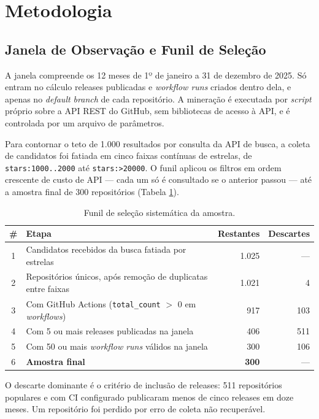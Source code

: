 \documentclass[12pt]{article}
\begin{document}
\section{Metodologia}
\label{sec:metodologia}

\subsection{Janela de Observação e Funil de Seleção}

A janela compreende os 12 meses de 1º de janeiro a 31 de dezembro de 2025. Só entram no
cálculo releases publicadas e \emph{workflow runs} criados dentro dela, e apenas no
\emph{default branch} de cada repositório. A mineração é executada por \emph{script}
próprio sobre a API REST do GitHub, sem bibliotecas de acesso à API, e é controlada por um
arquivo de parâmetros.

Para contornar o teto de 1.000 resultados por consulta da API de busca, a coleta de
candidatos foi fatiada em cinco faixas contínuas de estrelas, de \texttt{stars:1000..2000}
até \texttt{stars:>20000}. O funil aplicou os filtros em ordem crescente de custo de API ---
cada um só é consultado se o anterior passou --- até a amostra final de 300 repositórios
(Tabela \ref{tab:funil}).

\begin{table}[ht]
\centering
\caption{Funil de seleção sistemática da amostra.}
\label{tab:funil}
\footnotesize
\begin{tabular}{clrr}
\toprule
\textbf{\#} & \textbf{Etapa} & \textbf{Restantes} & \textbf{Descartes} \\
\midrule
1 & Candidatos recebidos da busca fatiada por estrelas & 1.025 & --- \\
2 & Repositórios únicos, após remoção de duplicatas entre faixas & 1.021 & 4 \\
3 & Com GitHub Actions (\texttt{total\_count} $>$ 0 em \emph{workflows}) & 917 & 103 \\
4 & Com 5 ou mais releases publicadas na janela & 406 & 511 \\
5 & Com 50 ou mais \emph{workflow runs} válidos na janela & 300 & 106 \\
\midrule
6 & \textbf{Amostra final} & \textbf{300} & --- \\
\bottomrule
\end{tabular}
\end{table}

O descarte dominante é o critério de inclusão de releases: 511 repositórios populares e com
CI configurado publicaram menos de cinco releases em doze meses. Um repositório foi perdido
por erro de coleta não recuperável.
\end{document}

